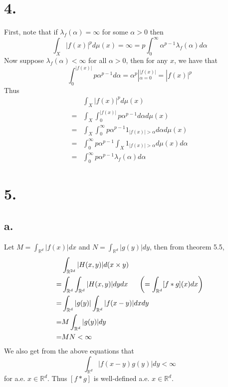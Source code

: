 \documentclass[11pt]{article}
\theoremstyle{mystyle}
\theoremstyle{definition}
\begin{document}
\section*{4.}
First, note that if $\lambda_f(\alpha) = \infty$ for some $\alpha > 0$ then 
\[
  \int_X |f(x)|^p d\mu(x) = \infty = p \int_0^\infty \alpha^{p-1} \lambda_f(\alpha) d\alpha
\]
Now suppose $\lambda_f(\alpha) < \infty$ for all $\alpha > 0$, then for any $x$, we have that 
\[
  \int_0^{|f(x)|} p\alpha^{p-1} d\alpha = \alpha^p |_{\alpha = 0}^{|f(x)|} = |f(x)|^p
\]
Thus 
\begin{align*}
  &\int_X |f(x)|^p d\mu(x) \\
  =& \int_X \int_0^{|f(x)|} p \alpha^{p-1} d\alpha d\mu(x) \\
  =& \int_X \int_0^\infty p\alpha^{p-1} 1_{|f(x)| > \alpha} d\alpha d\mu(x) \\
  =& \int_0^\infty p\alpha^{p-1} \int_X 1_{|f(x)| > \alpha} d\mu(x)d\alpha \\
  =& \int_0^\infty p \alpha^{p-1} \lambda_f(\alpha) d\alpha
\end{align*}
\newpage
\section*{5.}
\subsection*{a.}
Let $M = \int_{\mathbb{R}^d} |f(x)| dx$ and $N = \int_{\mathbb{R}^d} |g(y)| dy$, then from theorem 5.5,  
\begin{align*}
  &\int_{\mathbb{R}^{2d}} |H(x,y)| d(x\times y) \\
  =& \int_{\mathbb{R}^d} \int_{\mathbb{R}^d} |H(x,y)| dy dx \indent  \left( =\int_{\mathbb{R}^d} [f * g](x) dx \right) \\
  =& \int_{\mathbb{R}^d} |g(y)| \int_{\mathbb{R}^d} |f(x-y)|  dx dy \\
  =& M \int_{\mathbb{R}^d} |g(y)| dy \\ 
  =& MN < \infty
\end{align*}
We also get from the above equations that 
\[
  \int_{\mathbb{R}^d} |f(x-y) g(y)| dy < \infty
\]
for a.e. $x \in \mathbb{R}^d$. Thus $[f*g]$ is well-defined a.e. $x \in \mathbb{R}^d$. 
\end{document}
